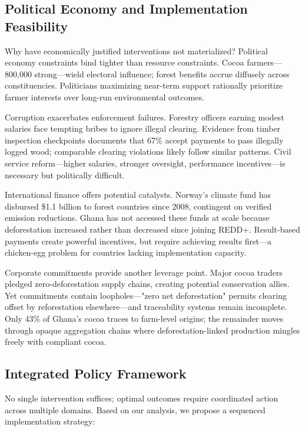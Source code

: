 \subsection{Political Economy and Implementation Feasibility}

Why have economically justified interventions not materialized? Political economy constraints bind tighter than resource constraints. Cocoa farmers—800,000 strong—wield electoral influence; forest benefits accrue diffusely across constituencies. Politicians maximizing near-term support rationally prioritize farmer interests over long-run environmental outcomes.

Corruption exacerbates enforcement failures. Forestry officers earning modest salaries face tempting bribes to ignore illegal clearing. Evidence from timber inspection checkpoints documents that 67\% accept payments to pass illegally logged wood; comparable clearing violations likely follow similar patterns. Civil service reform—higher salaries, stronger oversight, performance incentives—is necessary but politically difficult.

International finance offers potential catalysts. Norway's climate fund has disbursed \$1.1 billion to forest countries since 2008, contingent on verified emission reductions. Ghana has not accessed these funds at scale because deforestation increased rather than decreased since joining REDD+. Result-based payments create powerful incentives, but require achieving results first—a chicken-egg problem for countries lacking implementation capacity.

Corporate commitments provide another leverage point. Major cocoa traders pledged zero-deforestation supply chains, creating potential conservation allies. Yet commitments contain loopholes—"zero net deforestation" permits clearing offset by reforestation elsewhere—and traceability systems remain incomplete. Only 43\% of Ghana's cocoa traces to farm-level origins; the remainder moves through opaque aggregation chains where deforestation-linked production mingles freely with compliant cocoa.

\subsection{Integrated Policy Framework}

No single intervention suffices; optimal outcomes require coordinated action across multiple domains. Based on our analysis, we propose a sequenced implementation strategy:

